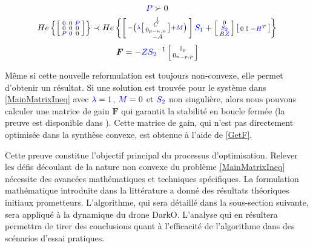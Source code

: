 \begin{equation}
\centering
  \begin{gathered}
        \textcolor{blue}{P} \succ 0 \\
        He\left\{ \smallmat{
            0 & 0 & \textcolor{blue}{P}\\
            0 & 0 & 0\\
            \textcolor{blue}{P} & 0 & 0
        }\right\}
    \prec
    He\left\{\smallmat{
        \mathbb{I}\\
            -\left( \textcolor{blue}{\lambda} \smallmat{
                C\\
                0_{p-n,n}                
            } + \textcolor{blue}{M} \right)\\
            -A
    }
    \textcolor{blue}{S_1} +
    \smallmat{
        0\\
        \textcolor{blue}{S_2}\\
        B\textcolor{blue}{Z}
    }
    \smallmat{
        0 & \mathbb{I} & -\textcolor{blue}{H}^T
    }\right\}
    \end{gathered}
    \label{MainMatrixIneq}
\end{equation}
\begin{equation}
    \boldsymbol{F} = -\textcolor{blue}{Z} \textcolor{blue}{S_2}^{-1} \left[ \begin{smallmatrix} \mathbb{I}_p \\ 0_{n-p,p}  \end{smallmatrix} \right]
    \label{GetF}
\end{equation}

Même si cette nouvelle reformulation est toujours non-convexe, elle permet d'obtenir un résultat. Si une solution est trouvée pour le système dans \eqref{MainMatrixIneq} avec $\textcolor{blue}{\lambda} = 1$, $\textcolor{blue}{M} = 0$ et $\textcolor{blue}{S_2}$ non singulière, alors nous pouvons calculer une matrice de gain $\boldsymbol{F}$ qui garantit la stabilité en boucle fermée (la preuve est disponible dans \cite{Arzelier2018}). Cette matrice de gain, qui n'est pas directement optimisée dans la synthèse convexe, est obtenue à l'aide de \eqref{GetF}. 

Cette preuve constitue l'objectif principal du processus d'optimisation. Relever les défis découlant de la nature non convexe du problème \ref{MainMatrixIneq} nécessite des avancées mathématiques et techniques spécifiques. La formulation mathématique introduite dans la littérature a donné des résultats théoriques initiaux prometteurs. L'algorithme, qui sera détaillé dans la sous-section suivante, sera appliqué à la dynamique du drone DarkO. L'analyse qui en résultera permettra de tirer des conclusions quant à l'efficacité de l'algorithme dans des scénarios d'essai pratiques.


